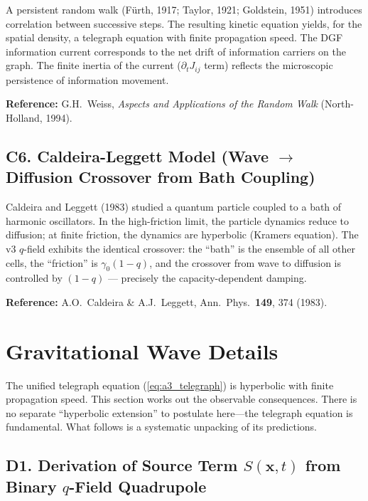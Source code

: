 \documentclass[reprint]{revtex4-2}
\begin{document}
A persistent random walk (F\"urth, 1917; Taylor, 1921; Goldstein, 1951) introduces correlation between successive steps. The resulting kinetic equation yields, for the spatial density, a telegraph equation with finite propagation speed. The DGF information current corresponds to the net drift of information carriers on the graph. The finite inertia of the current ($\partial_t J_{ij}$ term) reflects the microscopic persistence of information movement.

\textbf{Reference:} G.H.\ Weiss, \emph{Aspects and Applications of the Random Walk} (North-Holland, 1994).

\subsection{C6. Caldeira-Leggett Model (Wave $\to$ Diffusion Crossover from Bath Coupling)}

Caldeira and Leggett (1983) studied a quantum particle coupled to a bath of harmonic oscillators. In the high-friction limit, the particle dynamics reduce to diffusion; at finite friction, the dynamics are hyperbolic (Kramers equation). The v3 $q$-field exhibits the identical crossover: the ``bath'' is the ensemble of all other cells, the ``friction'' is $\gamma_0(1-q)$, and the crossover from wave to diffusion is controlled by $(1-q)$ --- precisely the capacity-dependent damping.

\textbf{Reference:} A.O.\ Caldeira \& A.J.\ Leggett, Ann.\ Phys.\ \textbf{149}, 374 (1983).

\section{Gravitational Wave Details}

The unified telegraph equation (\ref{eq:a3_telegraph}) is hyperbolic with finite propagation speed. This section works out the observable consequences. There is no separate ``hyperbolic extension'' to postulate here---the telegraph equation is fundamental. What follows is a systematic unpacking of its predictions.

\subsection{D1. Derivation of Source Term $S(\mathbf{x},t)$ from Binary $q$-Field Quadrupole}
\end{document}
